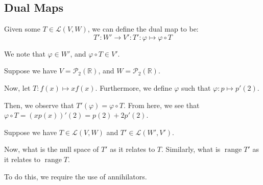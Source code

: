 \documentclass[openany]{book}
\newcommand{\RR}{\mathbb{R}}
\DeclareMathOperator*{\vrange}{range}
\begin{document}
\subsection{Dual Maps}
\begin{defn}
	Given some $T \in \mathcal L(V,W)$, we can define the dual map to be:
	\begin{equation*}
		T' : W' \rightarrow V' : T' : \varphi \mapsto \varphi \circ T
	\end{equation*}

	We note that $\varphi \in W'$, and $\varphi \circ T \in V'$.
\end{defn}
\begin{example}
	Suppose we have $V = \mathscr{P}_{2}(\RR)$, and $W = \mathscr{P}_{2}(\RR)$.
	
	Now, let $T : f(x) \mapsto xf(x)$. Furthermore, we define $\varphi$ such that $\varphi : p \mapsto p'(2)$.
	
	Then, we observe that $T'(\varphi) = \varphi \circ T$. From here, we see that $\varphi \circ T = (xp(x))'(2) = p(2) + 2p'(2)$.
\end{example}
\begin{example}
	Suppose we have $T \in \mathcal L(V,W)$ and $T' \in \mathcal L(W', V')$.
	
	Now, what is the null space of $T'$ as it relates to $T$. Similarly, what is $\vrange T'$ as it relates to $\vrange T$.
	
	To do this, we require the use of annihilators.
\end{example}
\end{document}
